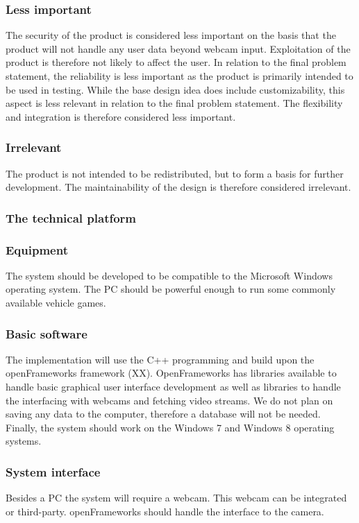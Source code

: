 \subsubsection*{Less important}
The security of the product is considered less important on the basis that the product will not handle any user data beyond webcam input. Exploitation of the product is therefore not likely to affect the user. In relation to the final problem statement, the reliability is less important as the product is primarily intended to be used in testing. While the base design idea does include customizability, this aspect is less relevant in relation to the final problem statement. The flexibility and integration is therefore considered less important. 

\subsubsection*{Irrelevant}
The product is not intended to be redistributed, but to form a basis for further development. The maintainability of the design is therefore considered irrelevant.

\subsubsection{The technical platform}
\subsubsection*{Equipment}
The system should be developed to be compatible to the Microsoft Windows operating system. The PC should be powerful enough to run some commonly available vehicle games. 

\subsubsection*{Basic software}
The implementation will use the C++ programming and build upon the openFrameworks framework (XX). OpenFrameworks has libraries available to handle basic graphical user interface development as well as libraries to handle the interfacing with webcams and fetching video streams. We do not plan on saving any data to the computer, therefore a database will not be needed. Finally, the system should work on the Windows 7 and Windows 8 operating systems.

\subsubsection*{System interface}
Besides a PC the system will require a webcam. This webcam can be integrated or third-party. openFrameworks should handle the interface to the camera.

